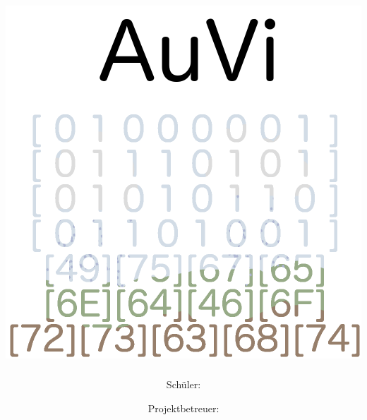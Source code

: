 \pagestyle{empty}
\title{\includegraphics[scale=.3]{imgs/auvi_white.png}\\\thema}
\author{Schüler:\\\mb \and Projektbetreuer:\\\re\\\tw}
\maketitle
